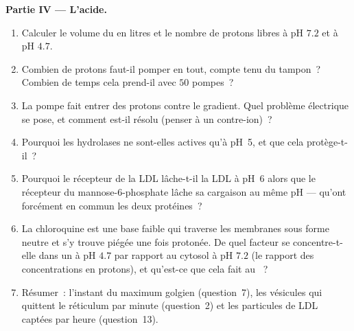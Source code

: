 \begin{problem}
\medskip
\noindent\textbf{Partie IV --- L'acide.}
\begin{enumerate}[resume]
  \item Calculer le volume du  en litres et le nombre de
        protons libres à pH $7.2$ et à pH $4.7$.
  \item Combien de protons faut-il pomper en tout, compte tenu du
        tampon~? Combien de temps cela prend-il avec $50$ pompes~?
  \item La pompe fait entrer des protons contre le gradient. Quel
        problème électrique se pose, et comment est-il résolu (penser à
        un contre-ion)~?
  \item Pourquoi les hydrolases ne sont-elles actives qu'à pH~5, et que
        cela protège-t-il~?
  \item Pourquoi le récepteur de la LDL lâche-t-il la LDL à pH~6 alors
        que le récepteur du mannose-6-phosphate lâche sa cargaison au
        même pH --- qu'ont forcément en commun les deux protéines~?
  \item La chloroquine est une base faible qui traverse les membranes
        sous forme neutre et s'y trouve piégée une fois protonée. De
        quel facteur se concentre-t-elle dans un  à pH $4.7$
        par rapport au cytosol à pH $7.2$ (le rapport des
        concentrations en protons), et qu'est-ce que cela fait au
        ~?
  \item Résumer~: l'instant du maximum golgien (question~7), les
        vésicules qui quittent le réticulum par minute (question~2) et
        les particules de LDL captées par heure (question~13).
\end{enumerate}
\end{problem}
